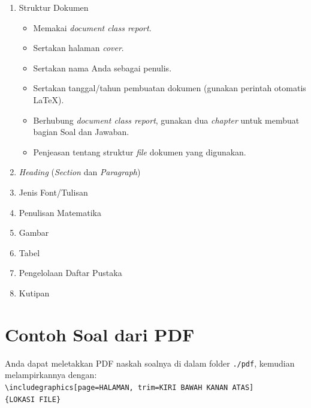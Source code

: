 \begin{enumerate}[nosep]
    \item Struktur Dokumen
    \begin{itemize}[leftmargin=.62cm]
        \item Memakai \textit{document class report}.
        \item Sertakan halaman \textit{cover}.
        \item Sertakan nama Anda sebagai penulis.
        \item Sertakan tanggal/tahun pembuatan dokumen (gunakan perintah otomatis LaTeX).
        \item Berhubung \textit{document class report}, gunakan dua \textit{chapter} untuk membuat bagian Soal dan Jawaban.
        \item Penjeasan tentang struktur \textit{file} dokumen yang digunakan.
    \end{itemize}
    \item \textit{Heading} (\textit{Section} dan \textit{Paragraph})
    \item Jenis Font/Tulisan
    \item Penulisan Matematika
    \item Gambar
    \item Tabel
    \item Pengelolaan Daftar Pustaka
    \item Kutipan
\end{enumerate}

\section{Contoh Soal dari PDF}

Anda dapat meletakkan PDF naskah soalnya di dalam folder \verb|./pdf|, kemudian melampirkannya dengan: \\
\verb|\includegraphics[page=HALAMAN, trim=KIRI BAWAH KANAN ATAS]| \\
\verb|{LOKASI FILE}|

